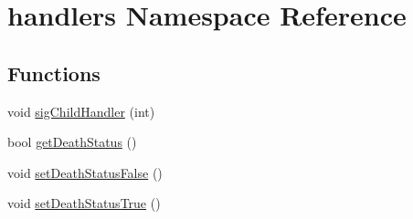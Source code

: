 \hypertarget{namespacehandlers}{
\section{handlers Namespace Reference}
\label{namespacehandlers}
}
\subsection*{Functions}
\begin{DoxyCompactItemize}
\item 
void \hyperlink{namespacehandlers_aa02fd1a028b7cfc01ccb52b9f70cb624}{sigChildHandler} (int)
\item 
bool \hyperlink{namespacehandlers_a7f732d800eb51bf0ee24d554ce770276}{getDeathStatus} ()
\item 
void \hyperlink{namespacehandlers_a254dfa6abeed4136e566fd013aa9fdc4}{setDeathStatusFalse} ()
\item 
void \hyperlink{namespacehandlers_a06dc78ff46f5dcc7fb9c09a495caf4ff}{setDeathStatusTrue} ()
\end{DoxyCompactItemize}


